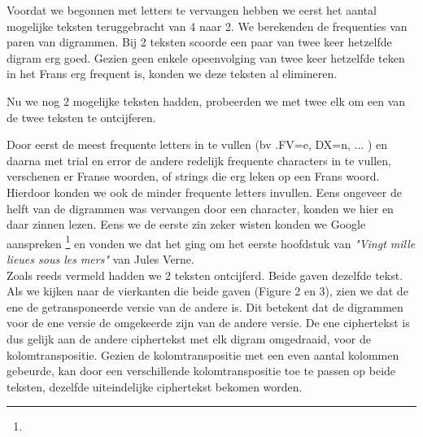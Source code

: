 Voordat we begonnen met letters te vervangen hebben we eerst het aantal mogelijke teksten teruggebracht van 4 naar 2. We berekenden de frequenties van paren van digrammen. Bij 2 teksten scoorde een paar van twee keer hetzelfde digram erg goed. Gezien geen enkele opeenvolging van twee keer hetzelfde teken in het Frans erg frequent is, konden we deze teksten al elimineren.

\noindent Nu we nog 2 mogelijke teksten hadden, probeerden we met twee elk om een van de twee teksten te ontcijferen.

\noindent Door eerst de meest frequente letters in te vullen (bv .FV=e, DX=n, ... ) en daarna met trial en error de andere redelijk frequente characters in te vullen, verschenen er Franse woorden, of strings die erg leken op een Frans woord. Hierdoor konden we ook de minder frequente letters invullen. Eens ongeveer de helft van de digrammen was vervangen door een character, konden we hier en daar zinnen lezen. Eens we de eerste zin zeker wisten konden we Google aanspreken \footnote{\googleSearch} en vonden we dat het ging om het eerste hoofdstuk van \textit{"Vingt mille lieues sous les mers"} van Jules Verne. \\

\noindent Zoals reeds vermeld hadden we 2 teksten ontcijferd. Beide gaven dezelfde tekst. Als we kijken naar de vierkanten die beide gaven (Figure 2 en 3), zien we dat de ene de getransponeerde versie van de andere is. Dit betekent dat de digrammen voor de ene versie de omgekeerde zijn van de andere versie. De ene ciphertekst is dus gelijk aan de andere ciphertekst met elk digram omgedraaid, voor de kolomtranspositie. Gezien de kolomtranspositie met een even aantal kolommen gebeurde, kan door een verschillende kolomtranspositie toe te passen op beide teksten, dezelfde uiteindelijke ciphertekst bekomen worden.


